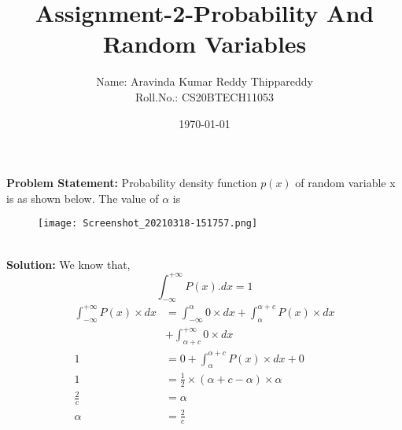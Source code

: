 \documentclass[11pt,a4paper,twocolumn]{article}
\title{Assignment-2-Probability And Random Variables}
\author{Name: Aravinda Kumar Reddy Thippareddy\\
Roll.No.: CS20BTECH11053 }
\date{\today}
\begin{document}
\maketitle
\textbf{Problem Statement:} Probability density function $p(x)$ of random variable x is as shown below. The value of ${\alpha}$ is
\begin{figure}[h]
\centering
 \texttt{[image: Screenshot\_20210318-151757.png]}
\end{figure}
\\\textbf{Solution:}
We know that, $$\int_{-\infty}^{+\infty}P(x).dx=1$$
\begin{align}
    \int_{-\infty}^{+\infty}P(x){\times}dx&=\int_{-\infty}^{\alpha}0\times{dx}+\int_{\alpha}^{{\alpha}+c}P(x){\times}dx\\
    &+\int_{\alpha+c}^{+\infty}0\times{dx}\\
    1&=0+\int_{\alpha}^{\alpha+c}P(x)\times{dx}+0\\
    1&=\frac{1}{2}\times{(\alpha+c-\alpha)}\times{\alpha}\\
    \frac{2}{c}&=\alpha\\
    {\alpha}&=\frac{2}{c}
\end{align}
\end{document}
